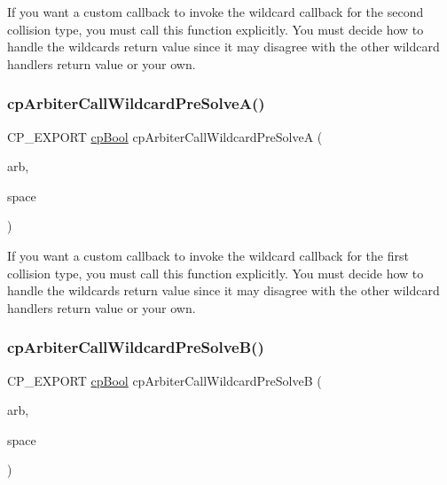 If you want a custom callback to invoke the wildcard callback for the second collision type, you must call this function explicitly. You must decide how to handle the wildcard\textquotesingle{}s return value since it may disagree with the other wildcard handler\textquotesingle{}s return value or your own. \mbox{\label{group__cpArbiter_ga3e69fd89f304026f6f5248bc49fd6bba}} 
\subsubsection{\texorpdfstring{cp\+Arbiter\+Call\+Wildcard\+Pre\+Solve\+A()}{cpArbiterCallWildcardPreSolveA()}}
{\footnotesize\ttfamily C\+P\+\_\+\+E\+X\+P\+O\+RT \hyperlink{group__basicTypes_gabc5e752c48f3449ca26ef413ecbd647e}{cp\+Bool} cp\+Arbiter\+Call\+Wildcard\+Pre\+SolveA (\begin{DoxyParamCaption}\item[{\hyperlink{structcpArbiter}{cp\+Arbiter} $\ast$}]{arb,  }\item[{\hyperlink{structcpSpace}{cp\+Space} $\ast$}]{space }\end{DoxyParamCaption})}

If you want a custom callback to invoke the wildcard callback for the first collision type, you must call this function explicitly. You must decide how to handle the wildcard\textquotesingle{}s return value since it may disagree with the other wildcard handler\textquotesingle{}s return value or your own. \mbox{\label{group__cpArbiter_ga61954fc86039826a56e504f483ebe8a6}} 
\subsubsection{\texorpdfstring{cp\+Arbiter\+Call\+Wildcard\+Pre\+Solve\+B()}{cpArbiterCallWildcardPreSolveB()}}
{\footnotesize\ttfamily C\+P\+\_\+\+E\+X\+P\+O\+RT \hyperlink{group__basicTypes_gabc5e752c48f3449ca26ef413ecbd647e}{cp\+Bool} cp\+Arbiter\+Call\+Wildcard\+Pre\+SolveB (\begin{DoxyParamCaption}\item[{\hyperlink{structcpArbiter}{cp\+Arbiter} $\ast$}]{arb,  }\item[{\hyperlink{structcpSpace}{cp\+Space} $\ast$}]{space }\end{DoxyParamCaption})}

